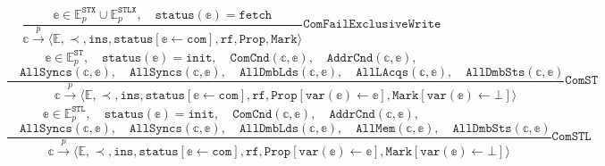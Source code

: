 \documentclass{article}
\newcommand{\var}{\texttt}
\begin{document}
$$\frac{\mathbb{e} \in \mathbb{E}_p^\var{STX} \cup \mathbb{E}_p^\var{STLX}, \hspace{1em} \texttt{status}(\mathbb{e}) = \texttt{fetch}}{\mathbb{c} \xrightarrow[]{p} \langle \mathbb{E}, \prec, \texttt{ins}, \texttt{status}[\mathbb{e} \leftarrow \texttt{com}], \texttt{rf}, \texttt{Prop}, \var{Mark}\rangle} \texttt{ComFailExclusiveWrite}$$
$$\mathbb{e} \in \mathbb{E}_p^\var{ST}, \hspace{1em} \texttt{status}(\mathbb{e}) = \texttt{init}, \hspace{1em} \texttt{ComCnd}(\mathbb{c},\mathbb{e}),\hspace{1em} \var{AddrCnd}(\mathbb{c},\mathbb{e}),$$
\vspace{-1.2em}$$\frac{\hspace{1em} \texttt{AllSyncs}(\mathbb{c},\mathbb{e}), \hspace{1em}\texttt{AllSyncs}(\mathbb{c},\mathbb{e}), \hspace{1em}\texttt{AllDmbLds}(\mathbb{c},\mathbb{e}), \hspace{1em} \texttt{AllLAcqs}(\mathbb{c},\mathbb{e}), \hspace{1em} \texttt{AllDmbSts}(\mathbb{c},\mathbb{e})}{\mathbb{c} \xrightarrow[]{p} \langle \mathbb{E}, \prec, \texttt{ins}, \texttt{status}[\mathbb{e} \leftarrow \texttt{com}], \texttt{rf}, \texttt{Prop}[\texttt{var}(\mathbb{e}) \leftarrow \mathbb{e}], \var{Mark}[\var{var}(\mathbb{e}) \gets \bot]\rangle} \texttt{ComST}$$
$$\mathbb{e} \in \mathbb{E}_p^\var{STL}, \hspace{1em} \texttt{status}(\mathbb{e}) = \texttt{init}, \hspace{1em} \texttt{ComCnd}(\mathbb{c},\mathbb{e}),\hspace{1em} \var{AddrCnd}(\mathbb{c},\mathbb{e}),$$
\vspace{-1.2em}$$\frac{\hspace{1em} \texttt{AllSyncs}(\mathbb{c},\mathbb{e}), \hspace{1em} \texttt{AllSyncs}(\mathbb{c},\mathbb{e}), \hspace{1em}\texttt{AllDmbLds}(\mathbb{c},\mathbb{e}), \hspace{1em} \texttt{AllMem}(\mathbb{c},\mathbb{e}), \hspace{1em} \texttt{AllDmbSts}(\mathbb{c},\mathbb{e})}{\mathbb{c} \xrightarrow[]{p} \langle \mathbb{E}, \prec, \texttt{ins}, \texttt{status}[\mathbb{e} \leftarrow \texttt{com}], \texttt{rf}, \texttt{Prop}[\texttt{var}(\mathbb{e}) \leftarrow \mathbb{e}], \var{Mark}[\var{var}(\mathbb{e}) \gets \bot]\rangle} \texttt{ComSTL}$$
\end{document}
